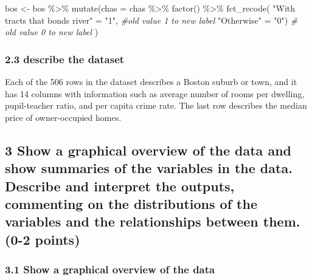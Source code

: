 \documentclass[
]{article}
\newenvironment{Shaded}{\begin{snugshade}}{\end{snugshade}}
\newcommand{\AttributeTok}[1]{\textcolor[rgb]{0.77,0.63,0.00}{#1}}
\newcommand{\CommentTok}[1]{\textcolor[rgb]{0.56,0.35,0.01}{\textit{#1}}}
\newcommand{\FunctionTok}[1]{\textcolor[rgb]{0.00,0.00,0.00}{#1}}
\newcommand{\NormalTok}[1]{#1}
\newcommand{\OtherTok}[1]{\textcolor[rgb]{0.56,0.35,0.01}{#1}}
\newcommand{\SpecialCharTok}[1]{\textcolor[rgb]{0.00,0.00,0.00}{#1}}
\newcommand{\StringTok}[1]{\textcolor[rgb]{0.31,0.60,0.02}{#1}}
\begin{document}
\begin{Shaded}
\begin{Highlighting}[]
\NormalTok{bos }\OtherTok{\textless{}{-}}\NormalTok{ bos }\SpecialCharTok{\%\textgreater{}\%} 
  \FunctionTok{mutate}\NormalTok{(}\AttributeTok{chas =}\NormalTok{ chas }\SpecialCharTok{\%\textgreater{}\%}
           \FunctionTok{factor}\NormalTok{() }\SpecialCharTok{\%\textgreater{}\%} 
           \FunctionTok{fct\_recode}\NormalTok{(}
             \StringTok{"With tracts that bonds river"} \OtherTok{=} \StringTok{"1"}\NormalTok{, }\CommentTok{\#old value 1 to new label}
             \StringTok{"Otherwise"} \OtherTok{=} \StringTok{"0"}\NormalTok{) }\CommentTok{\# old value 0 to new label}
\NormalTok{)}
\end{Highlighting}
\end{Shaded}

\hypertarget{describe-the-dataset}{%
\subsubsection{2.3 describe the dataset}\label{describe-the-dataset}}

Each of the 506 rows in the dataset describes a Boston suburb or town,
and it has 14 columns with information such as average number of rooms
per dwelling, pupil-teacher ratio, and per capita crime rate. The last
row describes the median price of owner-occupied homes.

\hypertarget{show-a-graphical-overview-of-the-data-and-show-summaries-of-the-variables-in-the-data.-describe-and-interpret-the-outputs-commenting-on-the-distributions-of-the-variables-and-the-relationships-between-them.-0-2-points}{%
\subsection{3 Show a graphical overview of the data and show summaries
of the variables in the data. Describe and interpret the outputs,
commenting on the distributions of the variables and the relationships
between them. (0-2
points)}\label{show-a-graphical-overview-of-the-data-and-show-summaries-of-the-variables-in-the-data.-describe-and-interpret-the-outputs-commenting-on-the-distributions-of-the-variables-and-the-relationships-between-them.-0-2-points}}

\hypertarget{show-a-graphical-overview-of-the-data}{%
\subsubsection{3.1 Show a graphical overview of the
data}\label{show-a-graphical-overview-of-the-data}}
\end{document}

